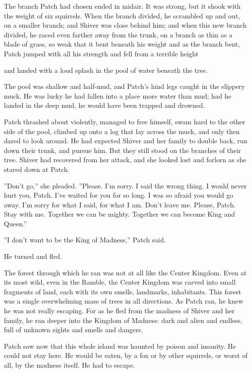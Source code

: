 \documentclass[11pt]{article}
\begin{document}
 The branch Patch had chosen ended in midair. It was strong, but it shook with the weight of six squirrels. When the branch divided, he scrambled up and out, on a smaller branch; and Shiver was close behind him; and when this new branch divided, he raced even farther away from the trunk, on a branch as thin as a blade of grass, so weak that it bent beneath his weight %
 and as the branch bent, Patch jumped with all his strength %
 and fell from a terrible height %
\par
 and landed with a loud splash in the pool of water beneath the tree.\par
 The pool was shallow and half-mud, and Patch's hind legs caught in the slippery muck. He was lucky he had fallen into a place more water than mud; had he landed in the deep mud, he would have been trapped and drowned.\par
Patch thrashed about violently, managed to free himself, swam hard to the other side of the pool, climbed up onto a log that lay across the muck, and only then dared to look around. He had expected Shiver and her family to double back, run down their trunk, and pursue him. But they still stood on the branches of their tree. Shiver had recovered from her attack, and she looked lost and forlorn as she stared down at Patch.\par
 ''Don't go,'' she pleaded. ''Please. I'm sorry. I said the wrong thing. I would never hurt you, Patch. I've waited for you for so long. I was so afraid you would go away. I'm sorry for what I said, for what I am. Don't leave me. Please, Patch. Stay with me. Together we can be mighty. Together we can become King and Queen.''\par
 ''I don't want to be the King of Madness,'' Patch said.\par
 He turned and fled.\par
 The forest through which he ran was not at all like the Center Kingdom. Even at its most wild, even in the Ramble, the Center Kingdom was carved into small fragments of land, each with its own smells, landmarks, inhabitants. This forest was a single overwhelming mass of trees in all directions. As Patch ran, he knew he was not really escaping. For as he fled from the madness of Shiver and her family, he ran deeper into the Kingdom of Madness: dark and alien and endless, full of unknown sights and smells and dangers.\par
 Patch saw now that this whole island was haunted by poison and insanity. He could not stay here. He would be eaten, by a fox or by other squirrels, or worst of all, by the madness itself. He had to escape.\par
\end{document}
